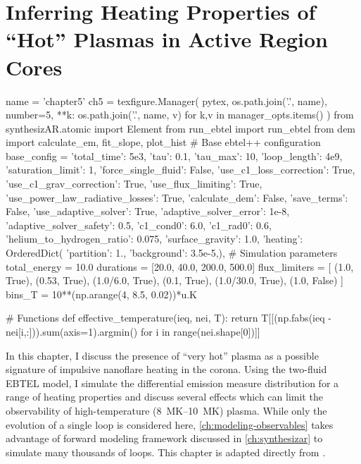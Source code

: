 \chapter{Inferring Heating Properties of ``Hot'' Plasmas in Active Region Cores}\label{ch:inferring_hot_plasma}
\thispagestyle{firstpageofchapterstyle}

\begin{pycode}[chapter5]
name = 'chapter5'
ch5 = texfigure.Manager(
    pytex,
    os.path.join('.', name),
    number=5,
    **{k: os.path.join('.', name, v) for k,v in manager_opts.items()}
)
from synthesizAR.atomic import Element
from run_ebtel import run_ebtel
from dem import calculate_em, fit_slope, plot_hist
# Base ebtel++ configuration
base_config = {
    'total_time': 5e3,
    'tau': 0.1,
    'tau_max': 10,
    'loop_length': 4e9,
    'saturation_limit': 1,
    'force_single_fluid': False,
    'use_c1_loss_correction': True,
    'use_c1_grav_correction': True,
    'use_flux_limiting': True,
    'use_power_law_radiative_losses': True,
    'calculate_dem': False,
    'save_terms': False,
    'use_adaptive_solver': True,
    'adaptive_solver_error': 1e-8,
    'adaptive_solver_safety': 0.5,
    'c1_cond0': 6.0,
    'c1_rad0': 0.6,
    'helium_to_hydrogen_ratio': 0.075,
    'surface_gravity': 1.0,
    'heating': OrderedDict({
        'partition': 1.,
        'background': 3.5e-5,}),
}
# Simulation parameters
total_energy = 10.0
durations = [20.0, 40.0, 200.0, 500.0]
flux_limiters = [
    (1.0, True),
    (0.53, True),
    (1.0/6.0, True),
    (0.1, True),
    (1.0/30.0, True),
    (1.0, False)
]
bins_T = 10**(np.arange(4, 8.5, 0.02))*u.K

# Functions
def effective_temperature(ieq, nei, T):
    return T[[(np.fabs(ieq - nei[i,:])).sum(axis=1).argmin() for i in range(nei.shape[0])]]
\end{pycode}

In this chapter, I discuss the presence of ``very hot'' plasma as a possible signature of impulsive nanoflare heating in the corona. Using the two-fluid EBTEL model, I simulate the differential emission measure distribution for a range of heating properties and discuss several effects which can limit the observability of high-temperature (\SIrange{8}{10}{\mega\kelvin}) plasma. While only the evolution of a single loop is considered here, \autoref{ch:modeling-observables} takes advantage of forward modeling framework discussed in \autoref{ch:synthesizar} to simulate many thousands of loops. This chapter is adapted directly from \citet{barnes_inference_2016}.

